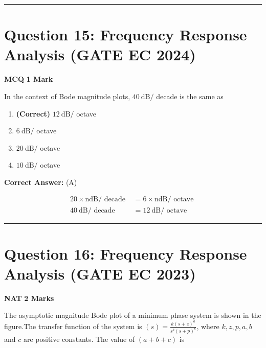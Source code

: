 \documentclass[11pt,a4paper]{article}
\begin{document}
\vspace{1.5em}
\hrule
\vspace{1.5em}

\section*{Question 15: Frequency Response Analysis (GATE EC 2024)}
\noindent \textbf{\color{primary}MCQ} \hfill \textbf{\color{secondary}1 Mark}


\noindent In the context of Bode magnitude plots, $40 \mathrm{~dB} /$ decade is the same as \underline{\hspace{1.5cm}}


\begin{enumerate}[label=(\Alph*)]
    \item \textbf{(Correct)} $12 \mathrm{~dB} /$ octave
    \item $6 \mathrm{~dB} /$ octave
    \item $20 \mathrm{~dB} /$ octave
    \item $10 \mathrm{~dB} /$ octave
\end{enumerate}

\noindent \textbf{Correct Answer:} (A)

\begin{tcolorbox}[solbox, title=Detailed Solution -- Question 15]
\[
\begin{aligned}
20 \times \mathrm{ndB} / \text { decade } & =6 \times \mathrm{n} \mathrm{dB} / \text { octave } \\
40 \mathrm{~dB} / \text { decade } & =12 \mathrm{~dB} / \text { octave }
\end{aligned}
\]
\end{tcolorbox}

\vspace{1.5em}
\hrule
\vspace{1.5em}

\section*{Question 16: Frequency Response Analysis (GATE EC 2023)}
\noindent \textbf{\color{primary}NAT} \hfill \textbf{\color{secondary}2 Marks}


\noindent The asymptotic magnitude Bode plot of a minimum phase system is shown in the figure.The transfer function of the system is $(s)=\frac{k(s+z)^{a}}{s^{b}(s+p)^{c}}$, where $k, z, p, a, b$ and $c$ are positive constants. The value of $(a+b+c)$ is \underline{\hspace{1.5cm}} 
\end{document}
